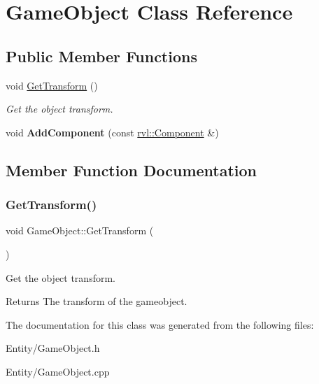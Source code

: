 \hypertarget{class_game_object}{}\section{Game\+Object Class Reference}
\label{class_game_object}
\subsection*{Public Member Functions}
\begin{DoxyCompactItemize}
\item 
void \hyperlink{class_game_object_a926ece6e0dffd42ca39a1104c42eadaf}{Get\+Transform} ()
\begin{DoxyCompactList}\small\item\em Get the object transform. \end{DoxyCompactList}\item 
\mbox{\label{class_game_object_a39f53203d46a31597b758f8e7b3eaf47}} 
void {\bfseries Add\+Component} (const \hyperlink{classrvl_1_1_component}{rvl\+::\+Component} \&)
\end{DoxyCompactItemize}


\subsection{Member Function Documentation}
\mbox{\label{class_game_object_a926ece6e0dffd42ca39a1104c42eadaf}} 
\subsubsection{\texorpdfstring{Get\+Transform()}{GetTransform()}}
{\footnotesize\ttfamily void Game\+Object\+::\+Get\+Transform (\begin{DoxyParamCaption}{ }\end{DoxyParamCaption})}



Get the object transform. 

\begin{DoxyReturn}{Returns}
The transform of the gameobject. 
\end{DoxyReturn}


The documentation for this class was generated from the following files\+:\begin{DoxyCompactItemize}
\item 
Entity/Game\+Object.\+h\item 
Entity/Game\+Object.\+cpp\end{DoxyCompactItemize}
